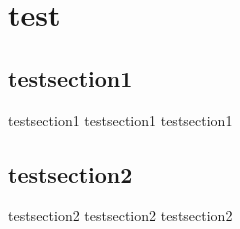 \chapter{test}
\section{testsection1}
testsection1 testsection1 testsection1

\section{testsection2}
testsection2 testsection2 testsection2

